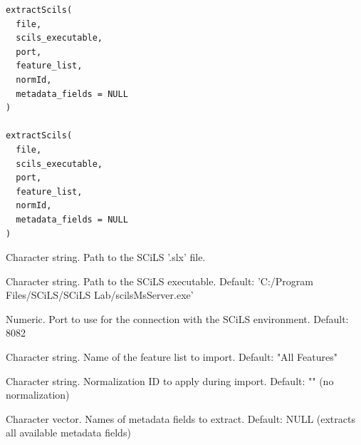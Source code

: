 \documentclass[a4paper]{book}
\begin{document}
%
\begin{Usage}
\begin{verbatim}
extractScils(
  file,
  scils_executable,
  port,
  feature_list,
  normId,
  metadata_fields = NULL
)

extractScils(
  file,
  scils_executable,
  port,
  feature_list,
  normId,
  metadata_fields = NULL
)
\end{verbatim}
\end{Usage}
%
\begin{Arguments}
\begin{ldescription}
\item[\code{file}] Character string. Path to the SCiLS '.slx' file.

\item[\code{scils\_executable}] Character string. Path to the SCiLS executable.
Default: 'C:/Program Files/SCiLS/SCiLS Lab/scilsMsServer.exe'

\item[\code{port}] Numeric. Port to use for the connection with the SCiLS environment.
Default: 8082

\item[\code{feature\_list}] Character string. Name of the feature list to import.
Default: "All Features"

\item[\code{normId}] Character string. Normalization ID to apply during import.
Default: "" (no normalization)

\item[\code{metadata\_fields}] Character vector. Names of metadata fields to extract.
Default: NULL (extracts all available metadata fields)
\end{ldescription}
\end{Arguments}
%
\end{document}
